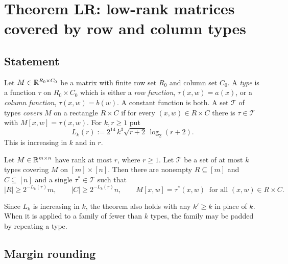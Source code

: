\section{Theorem LR: low-rank matrices covered by row and column types}\label{sec:LR}

\subsection{Statement}
Let $M\in\mathbb{R}^{R_0\times C_0}$ be a matrix with finite row set $R_0$ and column set $C_0$. A \emph{type} is a function
$\tau$ on $R_0\times C_0$ which is either a \emph{row function}, $\tau(x,w)=a(x)$, or a \emph{column function},
$\tau(x,w)=b(w)$. A constant function is both. A set $\mathcal T$ of types \emph{covers} $M$ on a rectangle
$R\times C$ if for every $(x,w)\in R\times C$ there is $\tau\in\mathcal T$ with $M[x,w]=\tau(x,w)$. For $k,r\ge1$ put
\[
  L_k(r):=2^{14}\,k^3\sqrt{r+2}\,\log_2(r+2).
\]
This is increasing in $k$ and in $r$.

\begin{theorem}[Theorem LR]\label{thm:LR}
Let $M\in\mathbb{R}^{m\times n}$ have rank at most $r$, where $r\ge1$. Let $\mathcal T$ be a set of at most $k$ types
covering $M$ on $[m]\times[n]$. Then there are nonempty $R\subseteq[m]$ and $C\subseteq[n]$ and a single
$\tau^\ast\in\mathcal T$ such that
\[
  |R|\ge 2^{-L_k(r)}m,\qquad |C|\ge 2^{-L_k(r)}n,\qquad M[x,w]=\tau^\ast(x,w)\ \text{ for all }(x,w)\in R\times C .
\]
\end{theorem}

Since $L_k$ is increasing in $k$, the theorem also holds with any $k'\ge k$ in place of $k$. When it is
applied to a family of fewer than $k$ types, the family may be padded by repeating a type.

\subsection{Margin rounding}

